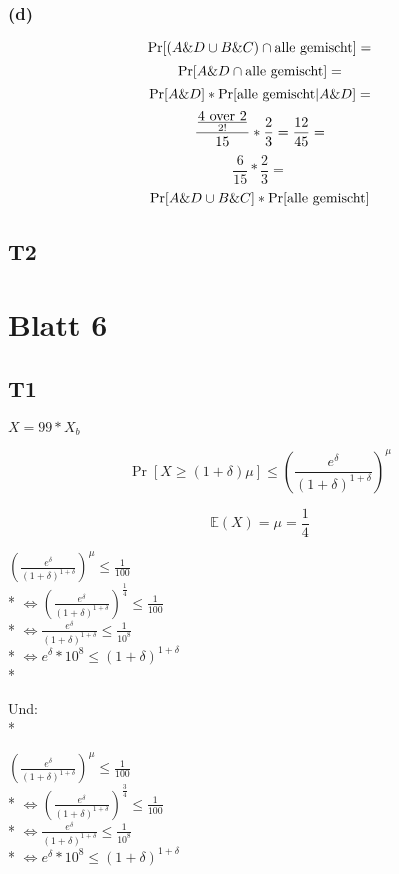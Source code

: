 \documentclass{article}
\begin{document}
\subsubsection*{(d)}

$$\Pr[(A\&D \cup B\&C) \cap \hbox{alle gemischt}]=$$
$$\Pr[A\&D \cap \hbox{alle gemischt}]=$$
$$\Pr[A\&D]*\Pr[\hbox{alle gemischt}|A\&D]=$$
$$\frac{\frac{\hbox{4 over 2}}{2!}}{15}*\frac{2}{3}=\frac{12}{45}=$$
$$\frac{6}{15}*\frac{2}{3}=$$
$$\Pr[A\&D \cup B\&C]*\Pr[\hbox{alle gemischt}]$$

\subsection*{T2}

\section*{Blatt 6}

\subsection*{T1}

$X=99*X_{b}$

$$\Pr[X \ge (1+\delta)\mu] \le (\frac{e^{\delta}}{(1+\delta)^{1+\delta}})^\mu$$

$$\mathbb{E}(X)=\mu=\frac{1}{4}$$

$(\frac{e^{\delta}}{(1+\delta)^{1+\delta}})^\mu \le \frac{1}{100}$\\*
$\Leftrightarrow (\frac{e^{\delta}}{(1+\delta)^{1+\delta}})^{\frac{1}{4}} \le \frac{1}{100}$\\*
$\Leftrightarrow \frac{e^{\delta}}{(1+\delta)^{1+\delta}} \le \frac{1}{10^8}$\\*
$\Leftrightarrow e^{\delta}*10^8 \le (1+\delta)^{1+\delta}$\\*

Und:\\*

$(\frac{e^{\delta}}{(1+\delta)^{1+\delta}})^\mu \le \frac{1}{100}$\\*
$\Leftrightarrow (\frac{e^{\delta}}{(1+\delta)^{1+\delta}})^{\frac{3}{4}} \le \frac{1}{100}$\\*
$\Leftrightarrow \frac{e^{\delta}}{(1+\delta)^{1+\delta}} \le \frac{1}{10^8}$\\*
$\Leftrightarrow e^{\delta}*10^8 \le (1+\delta)^{1+\delta}$
\end{document}
